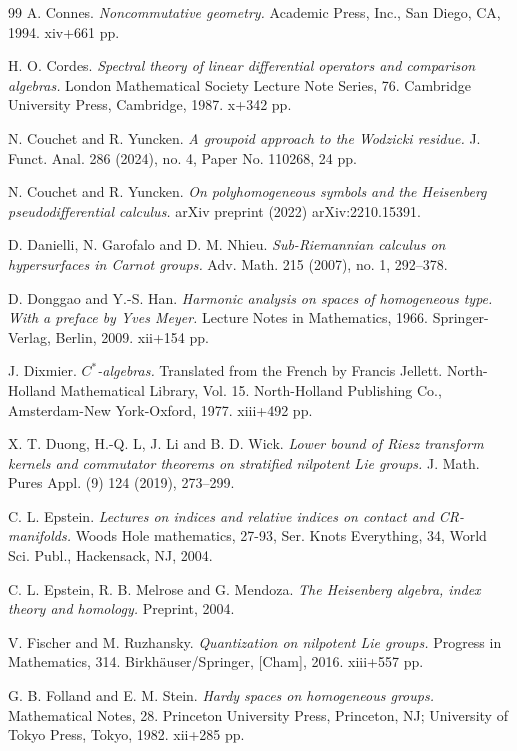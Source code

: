 \documentclass[leqno]{amsart}
\begin{document}
\begin{thebibliography}{99}
A. Connes. 
{\it Noncommutative geometry.} 
Academic Press, Inc., San Diego, CA, 1994. xiv+661 pp.

H. O. Cordes. 
{\it Spectral theory of linear differential operators and comparison algebras.} 
London Mathematical Society Lecture Note Series, 76. Cambridge University Press, Cambridge, 1987. x+342 pp.

N. Couchet and R. Yuncken.
{\it A groupoid approach to the Wodzicki residue.}
J. Funct. Anal. 286 (2024), no. 4, Paper No. 110268, 24 pp.

N. Couchet and R. Yuncken.
{\it On polyhomogeneous symbols and the Heisenberg pseudodifferential calculus.}
arXiv preprint (2022) arXiv:2210.15391.

D. Danielli, N. Garofalo and D. M. Nhieu. 
{\it Sub-Riemannian calculus on hypersurfaces in Carnot groups.} 
Adv. Math. 215 (2007), no. 1, 292--378. 

D. Donggao and Y.-S. Han. 
{\it Harmonic analysis on spaces of homogeneous type. With a preface by Yves Meyer.}
Lecture Notes in Mathematics, 1966. Springer-Verlag, Berlin, 2009. xii+154 pp.

J. Dixmier. 
{\it $C^{\ast}$-algebras.} Translated from the French by Francis Jellett. 
North-Holland Mathematical Library, Vol. 15. North-Holland Publishing Co., Amsterdam-New York-Oxford, 1977. xiii+492 pp.

X. T. Duong, H.-Q. L, J. Li and B. D. Wick. 
{\it Lower bound of Riesz transform kernels and commutator theorems on stratified nilpotent Lie groups.} J. Math. Pures Appl. (9) 124 (2019), 273--299.

C. L. Epstein.
{\it Lectures on indices and relative indices on contact and CR-manifolds.}
Woods Hole mathematics, 27-93, Ser. Knots Everything, 34, World Sci. Publ., Hackensack, NJ, 2004.


C. L. Epstein, R. B. Melrose and G. Mendoza.
{\it The Heisenberg algebra, index theory and homology.}
Preprint, 2004.

V. Fischer and M. Ruzhansky. 
{\it Quantization on nilpotent Lie groups.} 
Progress in Mathematics, 314. Birkhäuser/Springer, [Cham], 2016. xiii+557 pp.

G. B. Folland and E. M. Stein.
{\it Hardy spaces on homogeneous groups.}
Mathematical Notes, 28. Princeton University Press, Princeton, NJ; University of Tokyo Press, Tokyo, 1982. xii+285 pp.


\end{thebibliography}
\end{document}
